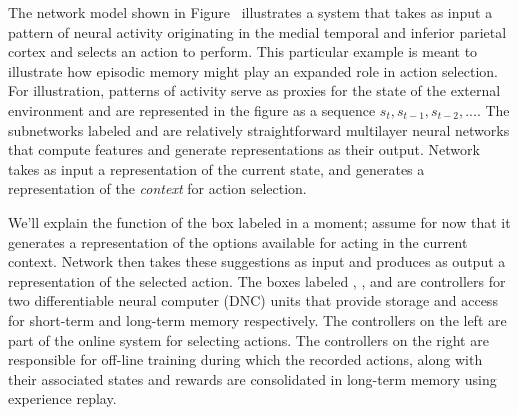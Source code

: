 The network model shown in Figure~{} illustrates a system that takes as input a pattern of neural activity originating in the medial temporal and inferior parietal cortex and selects an action to perform. This particular example is meant to illustrate how episodic memory might play an expanded role in action selection. For illustration, patterns of activity serve as proxies for the state of the external environment and are represented in the figure as a sequence $s_t, s_{t-1}, s_{t-2}, ...$. The subnetworks labeled  and  are relatively straightforward multilayer neural networks that compute features and generate representations as their output. Network  takes as input a representation of the current state, and generates a representation of the {\it{context}} for action selection.


We'll explain the function of the box labeled  in a moment; assume for now that it generates a representation of the options available for acting in the current context. Network  then takes these suggestions as input and produces as output a representation of the selected action. The boxes labeled , ,  and  are controllers for two differentiable neural computer (DNC) units that provide storage and access for short-term and long-term memory respectively. The controllers on the left are part of the online system for selecting actions. The controllers on the right are responsible for off-line training during which the recorded actions, along with their associated states and rewards are consolidated in long-term memory using experience replay.

